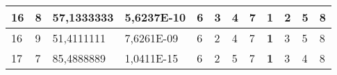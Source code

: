 \documentclass[conference]{IEEEtran}
\begin{document}
\begin{table*}[]
\begin{tabular}{|llll|llllllll|}
\multicolumn{1}{|l|}{16}                                                    & \multicolumn{1}{l|}{8}                                                        & \multicolumn{1}{l|}{57,1333333}                                                   & 5,6237E-10                     & \multicolumn{1}{l|}{6}                                                  & \multicolumn{1}{l|}{3}                                                  & \multicolumn{1}{l|}{4}                                                  & \multicolumn{1}{l|}{7}                                                  & \multicolumn{1}{l|}{\textbf{1}}                                         & \multicolumn{1}{l|}{2}                                                  & \multicolumn{1}{l|}{5}                                                  & 8                          \\ \hline
\multicolumn{1}{|l|}{16}                                                    & \multicolumn{1}{l|}{9}                                                        & \multicolumn{1}{l|}{51,4111111}                                                   & 7,6261E-09                     & \multicolumn{1}{l|}{6}                                                  & \multicolumn{1}{l|}{2}                                                  & \multicolumn{1}{l|}{4}                                                  & \multicolumn{1}{l|}{7}                                                  & \multicolumn{1}{l|}{\textbf{1}}                                         & \multicolumn{1}{l|}{3}                                                  & \multicolumn{1}{l|}{5}                                                  & 8                          \\ \hline
\multicolumn{1}{|l|}{17}                                                    & \multicolumn{1}{l|}{7}                                                        & \multicolumn{1}{l|}{85,4888889}                                                   & 1,0411E-15                     & \multicolumn{1}{l|}{6}                                                  & \multicolumn{1}{l|}{2}                                                  & \multicolumn{1}{l|}{5}                                                  & \multicolumn{1}{l|}{7}                                                  & \multicolumn{1}{l|}{\textbf{1}}                                         & \multicolumn{1}{l|}{3}                                                  & \multicolumn{1}{l|}{4}                                                  & 8                          \\ \hline

\end{tabular}
\end{table*}
\end{document}

